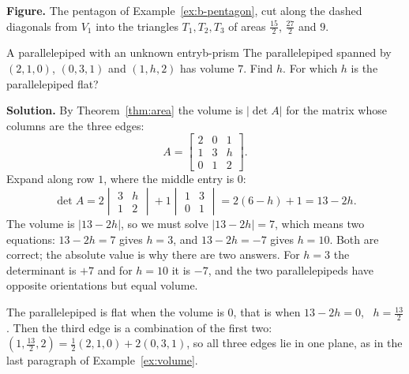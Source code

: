 \documentclass[11pt]{article}
\begin{document}
\begin{center}
\end{center}

\textbf{Figure.} The pentagon of Example~\ref{ex:b-pentagon}, cut along the dashed diagonals from $V_1$ into the triangles $T_1,T_2,T_3$ of areas $\tfrac{15}2$, $\tfrac{27}2$ and $9$.

\begin{exmp}{A parallelepiped with an unknown entry}{b-prism}
The parallelepiped spanned by $(2,1,0)$, $(0,3,1)$ and $(1,h,2)$ has volume $7$. Find $h$. For which $h$ is the parallelepiped flat?

\textbf{Solution.} By Theorem~\ref{thm:area} the volume is $|\det A|$ for the matrix whose columns are the three edges:
\[
A=\begin{bmatrix}2&0&1\\1&3&h\\0&1&2\end{bmatrix}.
\]
Expand along row $1$, where the middle entry is $0$:
\[
\det A=2\begin{vmatrix}3&h\\1&2\end{vmatrix}+1\begin{vmatrix}1&3\\0&1\end{vmatrix}=2(6-h)+1=13-2h.
\]
The volume is $|13-2h|$, so we must solve $|13-2h|=7$, which means two equations: $13-2h=7$ gives $h=3$, and $13-2h=-7$ gives $h=10$. Both are correct; the absolute value is why there are two answers. For $h=3$ the determinant is $+7$ and for $h=10$ it is $-7$, and the two parallelepipeds have opposite orientations but equal volume.

The parallelepiped is flat when the volume is $0$, that is when $13-2h=0$, \ $h=\tfrac{13}2$. Then the third edge is a combination of the first two: $(1,\tfrac{13}2,2)=\tfrac12(2,1,0)+2(0,3,1)$, so all three edges lie in one plane, as in the last paragraph of Example~\ref{ex:volume}.
\end{exmp}
\end{document}
